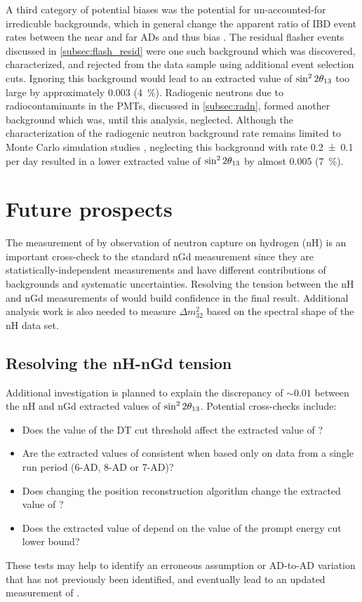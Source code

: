 A third category of potential biases
was the potential for un-accounted-for irredicuble backgrounds,
which in general change the apparent ratio of IBD event rates
between the near and far ADs and thus bias \thetaot{}.
The residual flasher events discussed in \cref{subsec:flash_resid}
were one such background which was discovered, characterized,
and rejected from the data sample using additional event selection cuts.
Ignoring this background would lead to an extracted value of $\sin^22\theta_{13}$
too large by approximately \num{0.003} (\SI{4}{\percent}).
Radiogenic neutrons due to radiocontaminants in the PMTs,
discussed in \cref{subsec:radn},
formed another background which was, until this analysis, neglected.
Although the characterization of the radiogenic neutron background rate
remains limited to Monte Carlo simulation studies \cite{rad_n},
neglecting this background with rate \num{0.2\pm0.1} per day
resulted in a lower extracted value of $\sin^22\theta_{13}$
by almost \num{0.005} (\SI{7}{\percent}).

\section{Future prospects}
\label{sec:future}

The measurement of \thetaot{} by observation of neutron capture on hydrogen (nH)
is an important cross-check to the standard nGd measurement
since they are statistically-independent measurements and
have different contributions of backgrounds and systematic uncertainties.
Resolving the tension between the nH and nGd measurements of \thetaot{}
would build confidence in the final result.
Additional analysis work is also needed to measure $\Delta m^2_{32}$
based on the spectral shape of the nH data set.

\subsection{Resolving the nH-nGd tension}
\label{subsec:tension}

Additional investigation is planned to explain the discrepancy
of $\sim0.01$ between the nH and nGd extracted values of $\sin^22\theta_{13}$.
Potential cross-checks include:
\begin{itemize}
    \item Does the value of the DT cut threshold affect the extracted value of
        \thetaot{}?
    \item Are the extracted values of \thetaot{} consistent when
        based only on data from a single run period (6-AD, 8-AD or 7-AD)?
    \item Does changing the position reconstruction algorithm
        change the extracted value of \thetaot{}?
    \item Does the extracted value of \thetaot{} depend on
        the value of the prompt energy cut lower bound?
\end{itemize}
These tests may help to identify an erroneous assumption
or AD-to-AD variation that has not previously been identified,
and eventually lead to an updated measurement of \thetaot{}.


